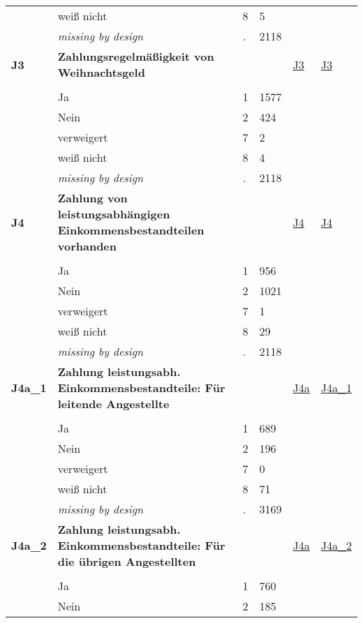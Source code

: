 \begin{longtable}{| L{2.45cm} | L{6cm} | C{1.5cm} | R{1cm} | C{2.25cm} | C{2.25cm} |}
   & weiß nicht & 8 & 5 &  &  \\ 
   & \textit{missing by design} & \textit{.} & 2118 &  &  \\ 
   \midrule
\textbf{J3}\label{var:J3} & \textbf{Zahlungsregelmäßigkeit von Weihnachtsgeld} &  &  & \hyperref[J3]{J3} & \hyperref[var:suf:J3]{J3} \\ 
   &  &  &  &  &  \\ 
   & Ja & 1 & 1577 &  &  \\ 
   & Nein & 2 & 424 &  &  \\ 
   & verweigert & 7 & 2 &  &  \\ 
   & weiß nicht & 8 & 4 &  &  \\ 
   & \textit{missing by design} & \textit{.} & 2118 &  &  \\ 
   \midrule
\textbf{J4}\label{var:J4} & \textbf{Zahlung von leistungsabhängigen Einkommensbestandteilen vorhanden} &  &  & \hyperref[J4]{J4} & \hyperref[var:suf:J4]{J4} \\ 
   &  &  &  &  &  \\ 
   & Ja & 1 & 956 &  &  \\ 
   & Nein & 2 & 1021 &  &  \\ 
   & verweigert & 7 & 1 &  &  \\ 
   & weiß nicht & 8 & 29 &  &  \\ 
   & \textit{missing by design} & \textit{.} & 2118 &  &  \\ 
   \midrule
\textbf{J4a\_1}\label{var:J4a:1} & \textbf{Zahlung leistungsabh. Einkommensbestandteile: Für leitende Angestellte} &  &  & \hyperref[J4a]{J4a} & \hyperref[var:suf:J4a:1]{J4a\_1} \\ 
   &  &  &  &  &  \\ 
   & Ja & 1 & 689 &  &  \\ 
   & Nein & 2 & 196 &  &  \\ 
   & verweigert & 7 & 0 &  &  \\ 
   & weiß nicht & 8 & 71 &  &  \\ 
   & \textit{missing by design} & \textit{.} & 3169 &  &  \\ 
   \midrule
\textbf{J4a\_2}\label{var:J4a:2} & \textbf{Zahlung leistungsabh. Einkommensbestandteile: Für die übrigen Angestellten} &  &  & \hyperref[J4a]{J4a} & \hyperref[var:suf:J4a:2]{J4a\_2} \\ 
   &  &  &  &  &  \\ 
   & Ja & 1 & 760 &  &  \\ 
   & Nein & 2 & 185 &  &  \\ 

\end{longtable}
